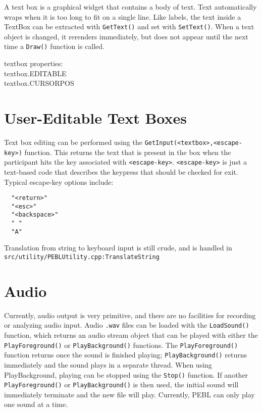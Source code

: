 A text box is a graphical widget that contains a body of text.  Text
automatically wraps when it is too long to fit on a single line.  Like
labels, the text inside a TextBox can be extracted with
\texttt{GetText()} and set with \texttt{SetText()}. When a text object
is changed, it rerenders immediately, but does not appear until the
next time a \texttt{Draw()} function is called.


textbox properties:\\
  textbox.EDITABLE\\
  textbox.CURSORPOS \\


\section{User-Editable Text Boxes}

Text box editing can be performed using the \verb+GetInput(<textbox>,<escape-key>)+ function.  This returns the text that is present in the box when the participant hits the key associated with \verb+<escape-key>+.  
\verb+<escape-key>+ is just a text-based code that describes the keypress 
that should be checked for exit. Typical escape-key options include:
\begin{verbatim}
  "<return>"
  "<esc>"
  "<backspace>"
  " "
  "A"
\end{verbatim}
 

Translation from string to keyboard input is still crude, 
and is handled in \texttt{src/utility/PEBLUtility.cpp:TranslateString} 


\section{Audio}

Currently, audio output is very primitive, and there are no facilities for recording or analyzing audio input. Audio \texttt{.wav} files can be loaded with the \texttt{LoadSound()} function, which returns an audio stream object that can be played  with either the \texttt{PlayForeground()} or \texttt{PlayBackground()} functions.  
The \texttt{PlayForeground()} function returns once the sound is finished playing; \texttt{PlayBackground()} returns immediately and the sound plays in a separate thread.  When using PlayBackground, playing can be stopped using the \texttt{Stop()} function.  If another \texttt{PlayForeground()} or \texttt{PlayBackground()} is then used,
the initial sound will immediately terminate and the new file will play. Currently, PEBL can only play one sound at a time.


